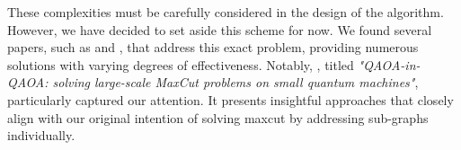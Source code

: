 These complexities must be carefully considered in the design of the algorithm. However, we have decided to set aside this scheme for now. We found several papers, such as \cite{li2021largescale} and \cite{zhou2022qaoainqaoa}, that address this exact problem, providing numerous solutions with varying degrees of effectiveness. Notably, \cite{zhou2022qaoainqaoa}, titled \textit{"QAOA-in-QAOA: solving large-scale MaxCut problems on small quantum machines"}, particularly captured our attention. It presents insightful approaches that closely align with our original intention of solving \acrshort{maxcut} by addressing sub-graphs individually.
